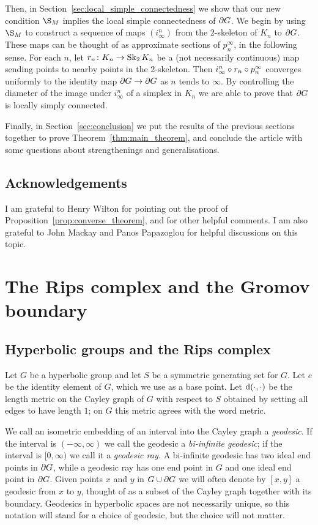 \documentclass[a4paper]{article}
\begin{document}
Then, in Section~\ref{sec:local_simple_connectedness} we show that our new
condition $\S_M$ implies the local simple connectedness of $\partial G$. We
begin by using $\S_M$ to construct a sequence of maps $(i^n_\infty)$ from the
2-skeleton of $K_n$ to $\partial G$. These maps can be thought of as
approximate sections of $p^\infty_n$, in the following sense. For each $n$, let
$r_n\colon K_n \to \operatorname{Sk}_2 K_n$ be a (not necessarily continuous) map sending
points to nearby points in the 2-skeleton. Then $i^n_\infty\circ r_n
\circ p^\infty_n$ converges uniformly to the identity map $\partial G \to
\partial G$ as $n$ tends to $\infty$. By controlling the diameter of the image
under $i^n_\infty$ of a simplex in $K_n$ we are able to prove that $\partial
G$ is locally simply connected.

Finally, in Section~\ref{sec:conclusion} we put the results of the previous
sections together to prove Theorem~\ref{thm:main_theorem}, and conclude the
article with some questions about strengthenings and generalisations.

\subsection*{Acknowledgements}

I am grateful to Henry Wilton for pointing out the proof of
Proposition~\ref{prop:converse_theorem}, and for other helpful comments.  I am
also grateful to John Mackay and Panos Papazoglou for helpful discussions on
this topic.

\section{The Rips complex and the Gromov boundary}\label{sec:spheres}

\subsection{Hyperbolic groups and the Rips complex}

Let $G$ be a hyperbolic group and let $S$ be a symmetric generating set for
$G$. Let $e$ be the identity element of $G$, which we use as a base point. Let
$\operatorname{d}(\cdot, \cdot)$ be the length metric on the Cayley graph of $G$ with
respect to $S$ obtained by setting all edges to have length $1$; on $G$ this
metric agrees with the word metric. 

We call an isometric embedding of an interval into the Cayley graph a
\emph{geodesic}. If the interval is $(-\infty, \infty)$ we call the geodesic a
\emph{bi-infinite geodesic}; if the interval is $[0, \infty)$ we call it a
\emph{geodesic ray.} A bi-infinite geodesic has two ideal end points in
$\partial G$, while a geodesic ray has one end point in $G$ and one ideal end
point in $\partial G$.  Given points $x$ and $y$ in $G \cup \partial G$ we
will often denote by $[x,y]$ a geodesic from $x$ to $y$, thought of as a subset
of the Cayley graph together with its boundary. Geodesics in hyperbolic spaces
are not necessarily unique, so this notation will stand for a choice of
geodesic, but the choice will not matter.
\end{document}
